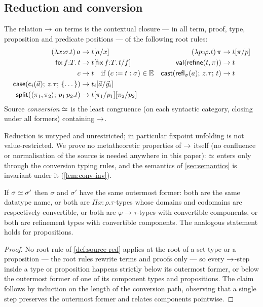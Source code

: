 \subsection{Reduction and conversion}
\label{sec:calculus-red}

\begin{definition}[Reduction]
\label{def:source-red}
The relation $\rightarrow$ on terms is the contextual closure --- in all term,
proof, type, proposition and predicate positions --- of the following root
rules:
\begin{align*}
  (\lambda x{:}\sigma.t)\,a &\rightarrow t[a/x]
  & (\lambda p{:}\varphi.t)\,\pi &\rightarrow t[\pi/p]
  \\
  \mathsf{fix}\,f{:}T.\,t &\rightarrow t[\mathsf{fix}\,f{:}T.\,t/f]
  & \mathsf{val}(\mathsf{refine}(t,\pi)) &\rightarrow t
  \\
  c &\rightarrow t \quad \text{if } (c \mathrel{:=} t : \sigma) \in \mathbb{E}
  & \mathsf{cast}(\mathsf{refl}_\sigma(a);\,z.\tau;\,t) &\rightarrow t
  \\
  \mathsf{case}(\mathsf{c}_i(\vec{a});\,z.\tau;\,\{\dots\}) &\rightarrow
     t_i[\vec{a}/\vec{y}_i]
  \\
  \mathsf{split}(\langle \pi_1, \pi_2 \rangle;\,p_1\,p_2.t) &\rightarrow
     t[\pi_1/p_1][\pi_2/p_2]
\end{align*}
Source \emph{conversion} $\simeq$ is the least congruence (on each
syntactic category, closing under all formers) containing $\rightarrow$.
\end{definition}

Reduction is untyped and unrestricted; in particular fixpoint unfolding is
not value-restricted.  We prove no metatheoretic properties of $\rightarrow$
itself (no confluence or normalisation of the source is needed anywhere in
this paper): $\simeq$ enters only through the conversion typing rules, and
the semantics of \cref{sec:semantics} is invariant under it
(\cref{lem:conv-inv}).

\begin{lemma}
\label{lem:rigid}
If $\sigma \simeq \sigma'$ then $\sigma$ and $\sigma'$ have the same
outermost former: both are the same datatype name, or both are
$\Pi x{:}\rho.\tau$-types whose domains and codomains are respectively
convertible, or both are $\varphi \to \tau$-types with convertible
components, or both are refinement types with convertible components.  The
analogous statement holds for propositions.
\end{lemma}

\begin{proof}
No root rule of \cref{def:source-red} applies at the root of a set type or
a proposition --- the root rules rewrite terms and proofs only --- so every
$\rightarrow$-step inside a type or proposition happens strictly below its
outermost former, or below the outermost former of one of its component
types and propositions.  The claim follows by induction on the length of
the conversion path, observing that a single step preserves the outermost
former and relates components pointwise.
\end{proof}

